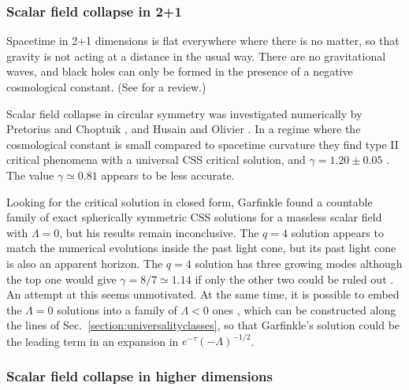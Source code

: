 \documentclass{article}
\begin{document}

\subsubsection{Scalar field collapse in 2+1}

Spacetime in 2+1 dimensions is flat everywhere where there is no
matter, so that gravity is not acting at a distance in the usual
way. There are no gravitational waves, and black holes can only be
formed in the presence of a negative cosmological constant.
(See \cite{Carlip} for a review.)

Scalar field collapse in circular symmetry was investigated
numerically by Pretorius and Choptuik \cite{PretoriusChoptuik}, and
Husain and Olivier \cite{HusainOlivier}. In a regime where the
cosmological constant is small compared to spacetime curvature they
find type II critical phenomena with a universal CSS critical
solution, and $\gamma=1.20\pm 0.05$ \cite{PretoriusChoptuik}. The
value $\gamma\simeq 0.81$ \cite{HusainOlivier} appears to be less
accurate.

Looking for the critical solution in closed form, Garfinkle
\cite{Garfinkle2+1} found a countable family of exact spherically
symmetric CSS solutions for a massless scalar field with $\Lambda=0$,
but his results remain inconclusive. The $q=4$ solution appears to
match the numerical evolutions inside the past light cone, but its
past light cone is also an apparent horizon. The $q=4$ solution has
three growing modes although the top one would give $\gamma=8/7\simeq
1.14$ if only the other two could be ruled out
\cite{GarfinkleGundlach2+1}. An attempt at this
\cite{HirschmannWangWu} seems unmotivated. At the same time, it is
possible to embed the $\Lambda=0$ solutions into a family of
$\Lambda<0$ ones \cite{ClementFabbri1,ClementFabbri2,Cavaglia}, which
can be constructed along the lines of
Sec.~\ref{section:universalityclasses}, so that Garfinkle's solution
could be the leading term in an expansion in
$e^{-\tau}(-\Lambda)^{-1/2}$.


\subsubsection{Scalar field collapse in higher dimensions}
\end{document}
